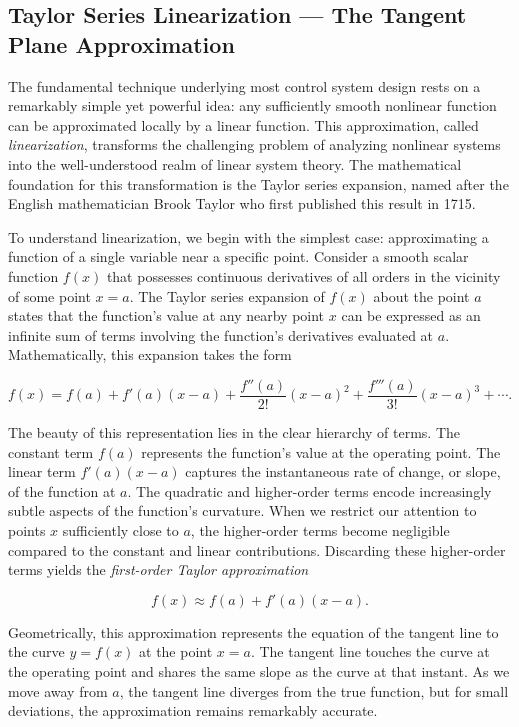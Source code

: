 \subsection{Taylor Series Linearization --- The Tangent Plane Approximation}

The fundamental technique underlying most control system design rests on a remarkably simple yet powerful idea: any sufficiently smooth nonlinear function can be approximated locally by a linear function. This approximation, called \emph{linearization}, transforms the challenging problem of analyzing nonlinear systems into the well-understood realm of linear system theory. The mathematical foundation for this transformation is the Taylor series expansion, named after the English mathematician Brook Taylor who first published this result in 1715.

To understand linearization, we begin with the simplest case: approximating a function of a single variable near a specific point. Consider a smooth scalar function $f(x)$ that possesses continuous derivatives of all orders in the vicinity of some point $x = a$. The Taylor series expansion of $f(x)$ about the point $a$ states that the function's value at any nearby point $x$ can be expressed as an infinite sum of terms involving the function's derivatives evaluated at $a$. Mathematically, this expansion takes the form

\[
f(x) = f(a) + f'(a)(x-a) + \frac{f''(a)}{2!}(x-a)^2 + \frac{f'''(a)}{3!}(x-a)^3 + \cdots.
\]

The beauty of this representation lies in the clear hierarchy of terms. The constant term $f(a)$ represents the function's value at the operating point. The linear term $f'(a)(x-a)$ captures the instantaneous rate of change, or slope, of the function at $a$. The quadratic and higher-order terms encode increasingly subtle aspects of the function's curvature. When we restrict our attention to points $x$ sufficiently close to $a$, the higher-order terms become negligible compared to the constant and linear contributions. Discarding these higher-order terms yields the \emph{first-order Taylor approximation}

\[
f(x) \approx f(a) + f'(a)(x-a).
\]

Geometrically, this approximation represents the equation of the tangent line to the curve $y = f(x)$ at the point $x = a$. The tangent line touches the curve at the operating point and shares the same slope as the curve at that instant. As we move away from $a$, the tangent line diverges from the true function, but for small deviations, the approximation remains remarkably accurate.

